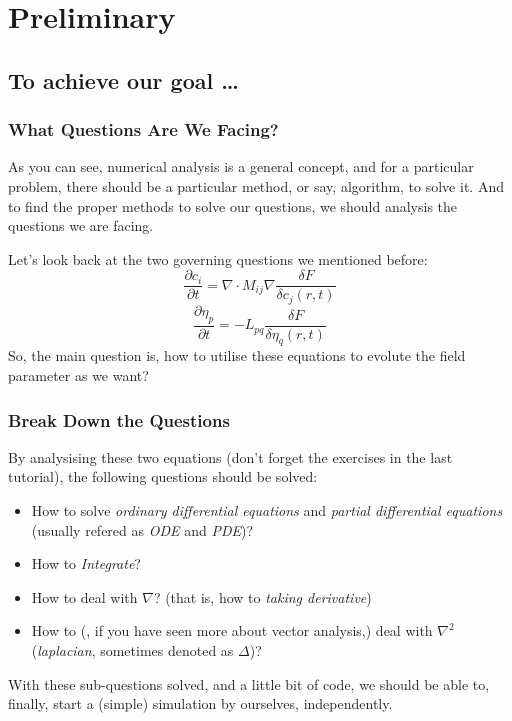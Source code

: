 \documentclass[compress,xcolor={dvipsnames}]{beamer}
\begin{document}
\section{Preliminary}
\subsection{To achieve our goal \dots}
\begin{frame}
    \frametitle{What Questions Are We Facing?}
    As you can see, numerical analysis is a general concept, and for a particular problem, there should be a particular method, or say, algorithm, to solve it.
    And to find the proper methods to solve our questions, we should analysis the questions we are facing.

    Let's look back at the two governing questions we mentioned before:
    \[
        \frac{\partial c_i}{\partial t} = \nabla \cdot M_{ij} \nabla \frac{\delta F}{\delta c_j \left( r,t \right)} \tag{Cahn-Hilliard}
    \]
    \[
        \frac{\partial \eta_p}{\partial t} = -L_{pq}\frac{\delta F}{\delta\eta_q\left( r,t \right)} \tag{Allen-Cahn}
    \]
    So, the main question is, how to utilise these equations to evolute the field parameter as we want?
\end{frame}

\begin{frame}
    \frametitle{Break Down the Questions}
    By analysising these two equations (don't forget the exercises in the last tutorial), the following questions should be solved:
    \pause
    \begin{itemize}
        \item How to solve \emph{ordinary differential equations} and \emph{partial differential equations} (usually refered as \emph{ODE} and \emph{PDE})?
        \item How to \emph{Integrate}?
        \item How to deal with \(\nabla\)? (that is, how to \emph{taking derivative})
        \item How to (, if you have seen more about vector analysis,) deal with \(\nabla^2\)(\emph{laplacian}, sometimes denoted as \(\Delta\))?
    \end{itemize}
    \pause
    With these sub-questions solved, and a little bit of code, we should be able to, finally, start a (simple) simulation by ourselves, independently.
\end{frame}
\end{document}
